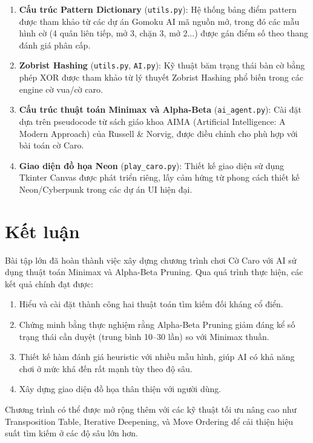 \documentclass[12pt,a4paper]{article}
\begin{document}
\begin{enumerate}
    \item \textbf{Cấu trúc Pattern Dictionary} (\texttt{utils.py}): Hệ thống bảng điểm pattern được tham khảo từ các dự án Gomoku AI mã nguồn mở, trong đó các mẫu hình cờ (4 quân liên tiếp, mở 3, chặn 3, mở 2...) được gán điểm số theo thang đánh giá phân cấp.

    \item \textbf{Zobrist Hashing} (\texttt{utils.py}, \texttt{AI.py}): Kỹ thuật băm trạng thái bàn cờ bằng phép XOR được tham khảo từ lý thuyết Zobrist Hashing phổ biến trong các engine cờ vua/cờ caro.

    \item \textbf{Cấu trúc thuật toán Minimax và Alpha-Beta} (\texttt{ai\_agent.py}): Cài đặt dựa trên pseudocode từ sách giáo khoa AIMA (Artificial Intelligence: A Modern Approach) của Russell \& Norvig, được điều chỉnh cho phù hợp với bài toán cờ Caro.

    \item \textbf{Giao diện đồ họa Neon} (\texttt{play\_caro.py}): Thiết kế giao diện sử dụng Tkinter Canvas được phát triển riêng, lấy cảm hứng từ phong cách thiết kế Neon/Cyberpunk trong các dự án UI hiện đại.
\end{enumerate}

\section*{Kết luận}

Bài tập lớn đã hoàn thành việc xây dựng chương trình chơi Cờ Caro với AI sử dụng thuật toán Minimax và Alpha-Beta Pruning. Qua quá trình thực hiện, các kết quả chính đạt được:

\begin{enumerate}
    \item Hiểu và cài đặt thành công hai thuật toán tìm kiếm đối kháng cổ điển.
    \item Chứng minh bằng thực nghiệm rằng Alpha-Beta Pruning giảm đáng kể số trạng thái cần duyệt (trung bình 10--30 lần) so với Minimax thuần.
    \item Thiết kế hàm đánh giá heuristic với nhiều mẫu hình, giúp AI có khả năng chơi ở mức khá đến rất mạnh tùy theo độ sâu.
    \item Xây dựng giao diện đồ họa thân thiện với người dùng.
\end{enumerate}

Chương trình có thể được mở rộng thêm với các kỹ thuật tối ưu nâng cao như Transposition Table, Iterative Deepening, và Move Ordering để cải thiện hiệu suất tìm kiếm ở các độ sâu lớn hơn.
\end{document}
